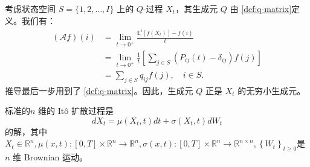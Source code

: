 %	 
%	 
%	 


	 \begin{theorem}[$Q$-过程的无穷小生成元] \label{ex:q-process-generator}
	 	考虑状态空间 $S = \{1, 2, \dots, I\}$ 上的 $Q$-过程 $X_t$，其生成元 $Q$ 由 \eqref{def:q-matrix}定义。我们有：
	 	\begin{align*}
	 		(\mathcal{A}f)(i) &= \lim_{t \to 0^+} \frac{\mathbb{E}^i [f(X_t)] - f(i)}{t} \\
	 		&= \lim_{t \to 0^+} \frac{1}{t} \left[ \sum_{j \in S} (P_{ij}(t) - \delta_{ij}) f(j) \right] \\
	 		&= \sum_{j \in S} q_{ij} f(j), \quad i \in S.
	 	\end{align*}
	 	推导最后一步用到了 \eqref{def:q-matrix}。因此，生成元 $Q$ 正是 $X_t$ 的无穷小生成元。
	 \end{theorem}
	
	标准的$n$ 维的 It\^{o} 扩散过程是
	 \begin{equation}
		 d X_{t}=\mu\left(X_{t}, t\right) d t+\sigma\left(X_{t}, t\right) d W_{t} 
		 \end{equation}
	 的解，其中 $X_{t} \in \mathbb{R}^{n}, \mu(x, t):[0, T] \times \mathbb{R}^{n} \rightarrow \mathbb{R}^{n}, \sigma(x, t):[0, T] \times \mathbb{R}^{n} \rightarrow \mathbb{R}^{n \times n},\left\{W_{t}\right\}_{t \geq 0}$是 $n$ 维 Brownian 运动。	
	
